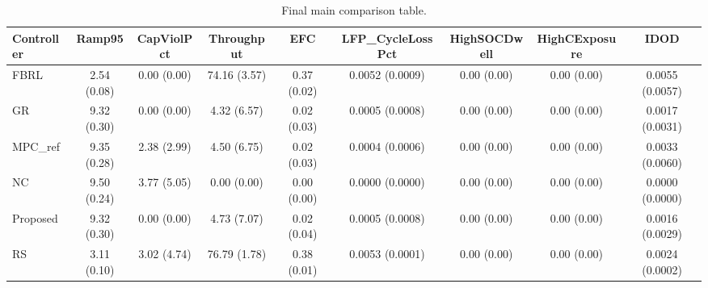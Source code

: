 \begin{table}[t]
\centering
\caption{Final main comparison table.}
\label{tab:results_final_auto}
\begin{tabular}{lcccccccc}
\toprule
Controller & Ramp95 & CapViolPct & Throughput & EFC & LFP\_CycleLossPct & HighSOCDwell & HighCExposure & IDOD \\
\midrule
FBRL & 2.54 (0.08) & 0.00 (0.00) & 74.16 (3.57) & 0.37 (0.02) & 0.0052 (0.0009) & 0.00 (0.00) & 0.00 (0.00) & 0.0055 (0.0057) \\
GR & 9.32 (0.30) & 0.00 (0.00) & 4.32 (6.57) & 0.02 (0.03) & 0.0005 (0.0008) & 0.00 (0.00) & 0.00 (0.00) & 0.0017 (0.0031) \\
MPC\_ref & 9.35 (0.28) & 2.38 (2.99) & 4.50 (6.75) & 0.02 (0.03) & 0.0004 (0.0006) & 0.00 (0.00) & 0.00 (0.00) & 0.0033 (0.0060) \\
NC & 9.50 (0.24) & 3.77 (5.05) & 0.00 (0.00) & 0.00 (0.00) & 0.0000 (0.0000) & 0.00 (0.00) & 0.00 (0.00) & 0.0000 (0.0000) \\
Proposed & 9.32 (0.30) & 0.00 (0.00) & 4.73 (7.07) & 0.02 (0.04) & 0.0005 (0.0008) & 0.00 (0.00) & 0.00 (0.00) & 0.0016 (0.0029) \\
RS & 3.11 (0.10) & 3.02 (4.74) & 76.79 (1.78) & 0.38 (0.01) & 0.0053 (0.0001) & 0.00 (0.00) & 0.00 (0.00) & 0.0024 (0.0002) \\
\bottomrule
\end{tabular}
\end{table}